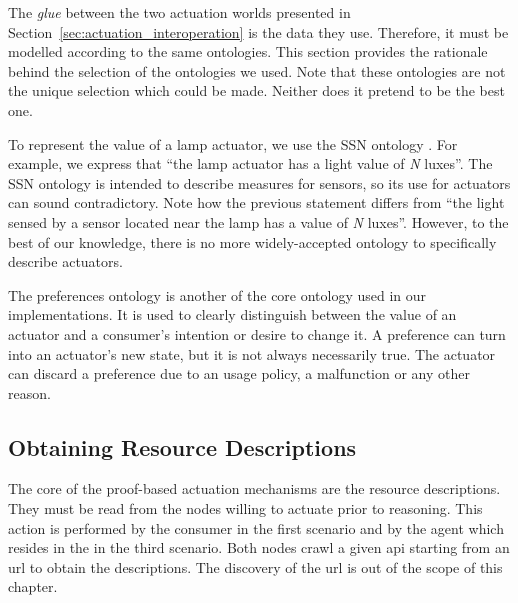 The \emph{glue} between the two actuation worlds presented in Section~\ref{sec:actuation_interoperation} is the data they use. %
Therefore, it must be modelled according to the same ontologies.
This section provides the rationale behind the selection of the ontologies we used.
Note that these ontologies are not the unique selection which could be made.
Neither does it pretend to be the best one.


To represent the value of a lamp actuator, we use the SSN ontology .
For example, we express that ``the lamp actuator has a light value of \emph{N} luxes''.
The SSN ontology is intended to describe measures for sensors, so its use for actuators can sound contradictory.
Note how the previous statement differs from ``the light sensed by a sensor located near the lamp has a value of \emph{N} luxes''.
However, to the best of our knowledge, there is no more widely-accepted ontology to specifically describe actuators.


The preferences ontology is another of the core ontology used in our implementations.
It is used to clearly distinguish between the value of an actuator and a consumer's intention or desire to change it.
A preference can turn into an actuator's new state, but it is not always necessarily true.
The actuator can discard a preference due to an usage policy, a malfunction or any other reason.




\subsection{Obtaining Resource Descriptions}

The core of the proof-based actuation mechanisms are the resource descriptions.
They must be read from the nodes willing to actuate prior to reasoning. %
This action is performed by the consumer in the first scenario and by the agent which resides in the \Space{} in the third scenario.
Both nodes crawl a given \ac{api} starting from an \ac{url} to obtain the descriptions.
The discovery of the \ac{url} is out of the scope of this chapter.



